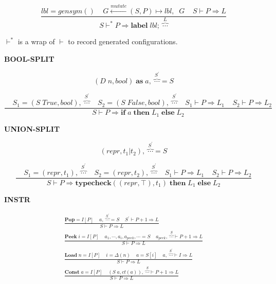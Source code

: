 \documentclass[12pt, a4paper]{report}
\newcommand{\rulegroup}[1]{
    \textbf{#1}
}
\newcommand{\gap}{ \;\;\;\; }
\begin{document}
\vspace*{-\baselineskip}
$$
\dfrac{
    \mathit{lbl} = gensym()
    \gap
    G \overset{mutate}{\leftarrow} (S, P) \mapsto \mathit{lbl}, \;\;  G
    \gap
    S \vdash P \Rightarrow L
}{
    S \vdash^{*} P \Rightarrow \mathbf{label} \; \mathit{lbl} ; \; \overbrace{\cdots}^{L}
}
$$

$\vdash^{*}$ is a wrap of $\vdash$ to record generated configurations.

\newpage

\rulegroup{BOOL-SPLIT}
\vspace*{\baselineskip}


$$
(D\; n, bool) \; \mathbf{as} \; a, \; \overbrace{\cdots}^{S^{'}}  = S
$$

\vspace*{-1.5\baselineskip}
$$
\dfrac{
    \gap
    S_1 = (S\;True, bool), \; \overbrace{\cdots}^{S^{'}}
    \gap
    S_2 = (S\;False, bool), \; \overbrace{\cdots}^{S^{'}}
    \gap
    S_1 \vdash P \Rightarrow L_1
    \gap
    S_2 \vdash P \Rightarrow L_2
}{
    S \vdash P \Rightarrow \mathbf{if} \; a \; \mathbf{then} \; L_1 \; \mathbf{else} \; L_2
}
$$


\rulegroup{UNION-SPLIT}

$$
(repr, t_1 | t_2), \; \overbrace{\cdots}^{S^{'}}  = S
$$


\vspace*{-1.5\baselineskip}
$$
\dfrac{
    \gap
    S_1 = (repr, t_1), \; \overbrace{\cdots}^{S^{'}}
    \gap
    S_2 = (repr, t_2), \; \overbrace{\cdots}^{S^{'}}
    \gap
    S_1 \vdash P \Rightarrow L_1
    \gap
    S_2 \vdash P \Rightarrow L_2
}{
    S \vdash P \Rightarrow  \mathbf{typecheck}((repr, \top), t_1) \; \mathbf{then} \; L_1 \; \mathbf{else} \; L_2
}
$$


\rulegroup{INSTR}

\begin{equation*}
\begin{split}
\frac{
    \mathbf{Pop} = I[P] \gap
    a , \; \overbrace{\cdots}^{S^{'}} = S \gap
    S^{'} \vdash P+1 \Rightarrow L
}{
    S \vdash P \Rightarrow L
}
\\
\frac{
    \mathbf{Peek}\; i = I[P] \gap
    a_1, \cdots, a_i, a_{peek}, \cdots = S \;\;\;\;
    a_{peek}, \; \overbrace{\cdots}^{S}  \vdash P + 1 \Rightarrow L
}{
    S \vdash P \Rightarrow L
}
\\
\frac{\mathbf{Load}\; n = I[P] \gap i = \Delta(n) \gap a = S[i] \gap a, \; \overbrace{\cdots}^{S^{'}} \vdash I \Rightarrow L }
     {S \vdash P  \Rightarrow L }
\;\;
\\
\frac{ \mathbf{Const}\; a = I[P] \gap (S\;a, ct(a)), \; \overbrace{\cdots}^{S} \vdash P + 1 \Rightarrow L  }
       { S \vdash P \Rightarrow L }
\end{split}
\end{equation*}
\end{document}
